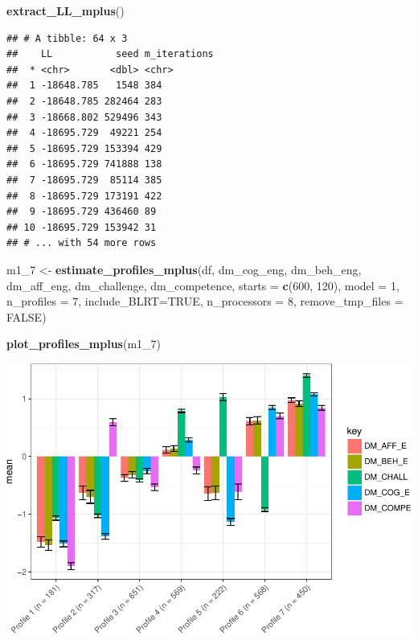 \documentclass[]{book}
\newenvironment{Shaded}{\begin{snugshade}}{\end{snugshade}}
\newcommand{\KeywordTok}[1]{\textcolor[rgb]{0.13,0.29,0.53}{\textbf{#1}}}
\newcommand{\DataTypeTok}[1]{\textcolor[rgb]{0.13,0.29,0.53}{#1}}
\newcommand{\DecValTok}[1]{\textcolor[rgb]{0.00,0.00,0.81}{#1}}
\newcommand{\StringTok}[1]{\textcolor[rgb]{0.31,0.60,0.02}{#1}}
\newcommand{\OtherTok}[1]{\textcolor[rgb]{0.56,0.35,0.01}{#1}}
\newcommand{\NormalTok}[1]{#1}
\begin{document}
\begin{Shaded}
\begin{Highlighting}[]
\KeywordTok{extract_LL_mplus}\NormalTok{()}
\end{Highlighting}
\end{Shaded}

\begin{verbatim}
## # A tibble: 64 x 3
##    LL           seed m_iterations
##  * <chr>       <dbl> <chr>       
##  1 -18648.785   1548 384         
##  2 -18648.785 282464 283         
##  3 -18668.802 529496 343         
##  4 -18695.729  49221 254         
##  5 -18695.729 153394 429         
##  6 -18695.729 741888 138         
##  7 -18695.729  85114 385         
##  8 -18695.729 173191 422         
##  9 -18695.729 436460 89          
## 10 -18695.729 153942 31          
## # ... with 54 more rows
\end{verbatim}

\begin{Shaded}
\begin{Highlighting}[]
\NormalTok{m1_}\DecValTok{7}\NormalTok{ <-}\StringTok{ }\KeywordTok{estimate_profiles_mplus}\NormalTok{(df,  }
\NormalTok{                             dm_cog_eng, dm_beh_eng, dm_aff_eng, dm_challenge, dm_competence,}
                             \DataTypeTok{starts =} \KeywordTok{c}\NormalTok{(}\DecValTok{600}\NormalTok{, }\DecValTok{120}\NormalTok{),}
                             \DataTypeTok{model =} \DecValTok{1}\NormalTok{,}
                             \DataTypeTok{n_profiles =} \DecValTok{7}\NormalTok{,}
                             \DataTypeTok{include_BLRT=}\OtherTok{TRUE}\NormalTok{,}
                             \DataTypeTok{n_processors =} \DecValTok{8}\NormalTok{, }\DataTypeTok{remove_tmp_files =} \OtherTok{FALSE}\NormalTok{)}

\KeywordTok{plot_profiles_mplus}\NormalTok{(m1_}\DecValTok{7}\NormalTok{)}
\end{Highlighting}
\end{Shaded}

\includegraphics{rosenberg-dissertation_files/figure-latex/spec-solutions-model1-5.pdf}
\end{document}
